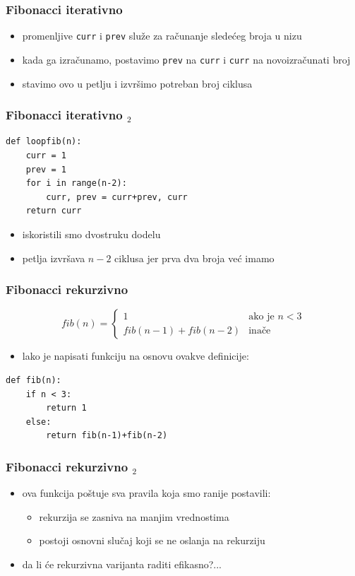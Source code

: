 \documentclass[utf8,compress]{beamer}
\begin{document}
\begin{frame}[fragile]
  \frametitle{Fibonacci iterativno}
  \begin{itemize}
    \item promenljive \texttt{curr} i \texttt{prev} služe za računanje sledećeg broja u nizu
    \item kada ga izračunamo, postavimo \texttt{prev} na \texttt{curr} i \texttt{curr} na novoizračunati broj
    \item stavimo ovo u petlju i izvršimo potreban broj ciklusa
  \end{itemize}
\end{frame}

\begin{frame}[fragile]
  \frametitle{Fibonacci iterativno $_2$}
\begin{verbatim}
def loopfib(n):
    curr = 1
    prev = 1
    for i in range(n-2):
        curr, prev = curr+prev, curr
    return curr
\end{verbatim}
  \begin{itemize}
    \item iskoristili smo dvostruku dodelu
    \item petlja izvršava $n-2$ ciklusa jer prva dva broja već imamo
  \end{itemize}
\end{frame}

\begin{frame}[fragile]
  \frametitle{Fibonacci rekurzivno}
$$ fib(n) = \left\{
  \begin{array}{ll}
    1 &\mbox{ako je $n<3$} \\
    fib(n-1)+fib(n-2) &\mbox{ina\v{c}e}
  \end{array} 
  \right. $$
  \begin{itemize}
    \item lako je napisati funkciju na osnovu ovakve definicije:
  \end{itemize}
\begin{verbatim}
def fib(n):
    if n < 3:
        return 1
    else:
        return fib(n-1)+fib(n-2)
\end{verbatim}
\end{frame}

\begin{frame}[fragile]
  \frametitle{Fibonacci rekurzivno $_2$}
  \begin{itemize}
    \item ova funkcija poštuje sva pravila koja smo ranije postavili:
  \begin{itemize}
    \item rekurzija se zasniva na manjim vrednostima
    \item postoji osnovni slučaj koji se ne oslanja na rekurziju
  \end{itemize}
    \item da li će rekurzivna varijanta raditi efikasno?...
  \end{itemize}
\end{frame}
\end{document}
